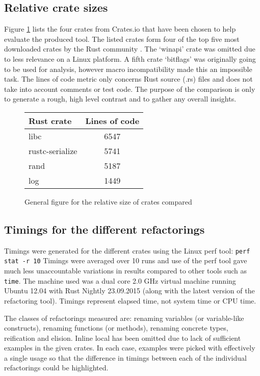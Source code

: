 \subsection{Relative crate sizes}
Figure \ref{Fig:codesize} lists the four crates from Crates.io that have been chosen to help evaluate the produced tool. The listed crates form four of the top five most downloaded crates by the Rust community \cite{cratesio15}. The `winapi' crate was omitted due to less relevance on a Linux platform. A fifth crate `bitflags' was originally going to be used for analysis, however macro incompatibility made this an impossible task. The lines of code metric only concerns Rust source (.rs) files and does not take into account comments or test code. The purpose of the comparison is only to generate a rough, high level contrast and to gather any overall insights. 

\begin{figure}[H]
\begin{center}
    \begin{tabular}{ | l | c |}
    \hline
    \textbf{Rust crate} & \textbf{Lines of code} \\ \hline
    libc & 6547 \\ \hline
    rustc-serialize &  5741 \\ \hline
    rand &   5187 \\ \hline
    log &  1449 \\ \hline
    \end{tabular}
\end{center}

\caption{General figure for the relative size of crates compared}
\label{Fig:codesize}
\end{figure}

\subsection{Timings for the different refactorings}
Timings were generated for the different crates using the Linux perf tool: {\verb|perf stat -r 10|} Timings were averaged over 10 runs and use of the perf tool gave much less unaccountable variations in results compared to other tools such as {\verb|time|}. The machine used was a dual core 2.0 GHz virtual machine running Ubuntu 12.04 with Rust Nightly 23.09.2015 (along with the latest version of the refactoring tool). Timings represent elapsed time, not system time or CPU time.

The classes of refactorings measured are: renaming variables (or variable-like constructs), renaming functions (or methods), renaming concrete types, reification and elision. Inline local has been omitted due to lack of sufficient examples in the given crates. In each case, examples were picked with effectively a single usage so that the difference in timings between each of the individual refactorings could be highlighted. 

